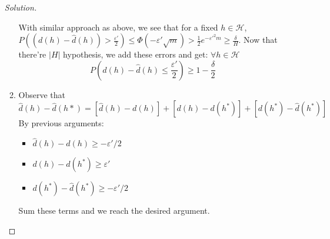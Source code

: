 \documentclass[12pt,letterpaper]{article}
\newenvironment{solution}{%
  \begin{proof}[Solution]$ $\par\nobreak\ignorespaces
}{%
  \end{proof}
}
\def \H{\mathcal H}
\begin{document}
\begin{enumerate}
\begin{solution}
\begin{enumerate}[label=(\alph*)]
  With similar approach as above, we see that for a fixed $h\in\H$, $P((d(h)-\hat d(h))> \frac{\varepsilon'}{2})\leq\Phi(-\varepsilon'\sqrt{m})>\frac{1}{2}e^{-\varepsilon'^{2}m}\geq \frac{\delta}{H}$. Now that there're $|H|$ hypothesis, we add these errors and get: $\forall h\in \H$
  \[P(d(h)-\hat d(h)\leq\frac{\varepsilon'}{2})\geq 1-\frac{\delta}{2}\]
\item Observe that
  \[\hat d(h)-\hat d(h*)=[\hat d(h)-d(h)]+[d(h)-d(h^{*})]+[d(h^{*})-\hat d(h^{*})]\]
  By previous arguments:
  \begin{itemize}
  \item $\hat d(h)-d(h)\geq -\varepsilon'/2$
  \item $d(h)-d(h^{*})\geq \varepsilon'$
  \item $d(h^{*})-\hat d(h^{*})\geq -\varepsilon'/2$
  \end{itemize}
  Sum these terms and we reach the desired argument.
\end{enumerate}
\end{solution}


\end{enumerate}
\end{document}
